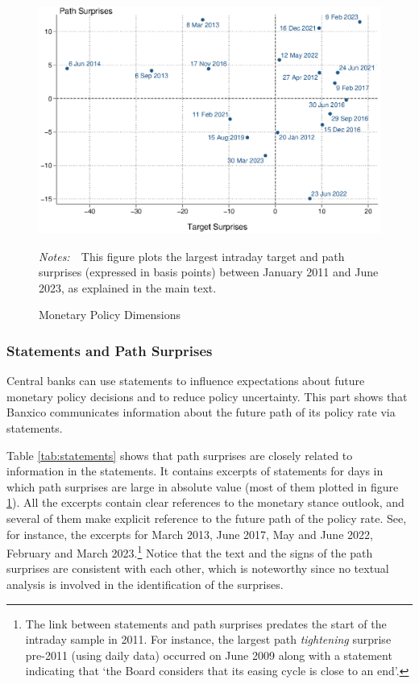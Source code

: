 \documentclass[a4paper, 12pt]{article}
\newcommand{\figtext}[1]{
	\vspace{-1ex}
	\captionsetup{justification=justified,font=footnotesize}
	\caption*{#1}
}
\newcommand{\fignotes}[1]{\figtext{\emph{Notes:~}~#1}}
\providecommand{\lastobsflwbdm}{June 2023}
\begin{document}
\begin{figure}[t]
	\caption{Monetary Policy Dimensions} \label{fig:factorspoints}
	\begin{center}
		\begin{minipage}{0.9\linewidth}
			\begin{center}
				\includegraphics[width=1\textwidth,height=.4\textheight]{../Figures/factorspointstg.eps} \\
			\end{center}
			\vspace{-0.4cm}
			\fignotes{This figure plots the largest intraday target and path surprises (expressed in basis points) between January 2011 and \lastobsflwbdm, as explained in the main text.} 
		\end{minipage}
	\end{center}
\end{figure}


\subsubsection{Statements and Path Surprises} \label{sec:pathsurprises}
Central banks can use statements to influence expectations about future monetary policy decisions and to reduce policy uncertainty. This part shows that Banxico communicates information about the future path of its policy rate via statements. 

Table \ref{tab:statements} shows that path surprises are closely related to information in the statements. 
It contains excerpts of statements for days in which path surprises are large in absolute value (most of them plotted in figure \ref{fig:factorspoints}). 
All the excerpts contain clear references to the monetary stance outlook, and several of them make explicit reference to the future path of the policy rate. See, for instance, the excerpts for March 2013, June 2017, May and June 2022, February and March 2023.\footnote{The link between statements and path surprises predates the start of the intraday sample in 2011. For instance, the largest path \textit{tightening} surprise pre-2011 (using daily data) occurred on June 2009 along with a statement indicating that `the Board considers that its easing cycle is close to an end'.} 
Notice that the text and the signs of the path surprises are consistent with each other, which is noteworthy since no textual analysis is involved in the identification of the surprises. 
\end{document}
